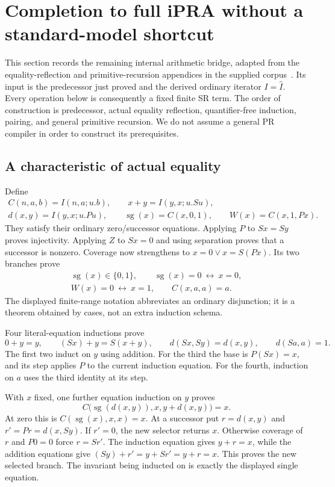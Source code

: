 \section{Completion to full iPRA without a standard-model shortcut}
\label{sec:completion}

This section records the remaining internal arithmetic bridge, adapted
from the equality-reflection and primitive-recursion appendices in the
supplied corpus~\cite{generated}. Its input is the predecessor just proved
and the derived ordinary iterator $I=\widehat I$. Every operation below
is consequently a fixed finite SR term. The order of construction is
predecessor, actual equality reflection, quantifier-free induction,
pairing, and general primitive recursion. We do not assume a general
PR compiler in order to construct its prerequisites.

\subsection{A characteristic of actual equality}

Define
\[
\begin{gathered}
 C(n,a,b)=I(n,a;u.b),\qquad x+y=I(y,x;u.Su),\\
 d(x,y)=I(y,x;u.Pu),\qquad
 \operatorname{sg}(x)=C(x,0,1),\qquad W(x)=C(x,1,Px).
\end{gathered}
\]
They satisfy their ordinary zero/successor equations. Applying $P$ to
$Sx=Sy$ proves injectivity. Applying $Z$ to $Sx=0$ and using separation
proves that a successor is nonzero. Coverage now strengthens to
$x=0\lor x=S(Px)$. Its two branches prove
\[
\begin{gathered}
 \operatorname{sg}(x)\in\{0,1\},\qquad
 \operatorname{sg}(x)=0\ \longleftrightarrow\ x=0,\\
 W(x)=0\ \longleftrightarrow\ x=1,\qquad C(x,a,a)=a.
\end{gathered}
\]
The displayed finite-range notation abbreviates an ordinary disjunction;
it is a theorem obtained by cases, not an extra induction schema.

Four literal-equation inductions prove
\[
 0+y=y,\qquad (Sx)+y=S(x+y),\qquad
 d(Sx,Sy)=d(x,y),\qquad d(Sa,a)=1.
\]
The first two induct on $y$ using addition. For the third the base is
$P(Sx)=x$, and its step applies $P$ to the current induction equation.
For the fourth, induction on $a$ uses the third identity at its step.

With $x$ fixed, one further equation induction on $y$ proves
\[
 C\bigl(\operatorname{sg}(d(x,y)),x,y+d(x,y)\bigr)=x.
 \tag{Residual}\label{eq:completion-residual}
\]
At zero this is $C(\operatorname{sg}(x),x,x)=x$. At a successor put
$r=d(x,y)$ and $r'=Pr=d(x,Sy)$. If $r'=0$, the new selector returns
$x$. Otherwise coverage of $r$ and $P0=0$ force $r=Sr'$. The induction
equation gives $y+r=x$, while the addition equations give
$(Sy)+r'=y+Sr'=y+r=x$. This proves the new selected branch. The
invariant being inducted on is exactly the displayed single equation.

